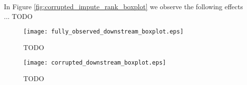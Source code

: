 In Figure \ref{fig:corrupted_impute_rank_boxplot} we observe the following effects ...
TODO



\begin{figure}\centering
	\texttt{[image: fully\_observed\_downstream\_boxplot.eps]}

	\caption[TODO]{TODO}
	\label{fig:fully_observed_downstream_boxplot}
\end{figure}

\begin{figure}\centering
	\texttt{[image: corrupted\_downstream\_boxplot.eps]}

	\caption[TODO]{TODO}
	\label{fig:corrupted_downstream_boxplot}
\end{figure}

